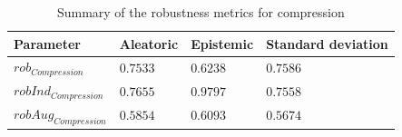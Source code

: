 \begin{table}[H]
	\centering
	\begin{tabular}{|| l | l | l | l ||} 
		\hline
		\textbf{Parameter} & \textbf{Aleatoric} & \textbf{Epistemic} & \textbf{Standard deviation} \\
		\hline
		\hline
		$rob_{Compression}$ & $0.7533$ & $0.6238$ & $0.7586$ \\
		$robInd_{Compression}$ & $0.7655$ & $0.9797$ & $0.7558$ \\
		$robAug_{Compression}$ & $0.5854$ & $0.6093$ & $0.5674$ \\	
		\hline
	\end{tabular}	
	\caption{Summary of the robustness metrics for compression}
	\label{table:rob_co}
\end{table}
